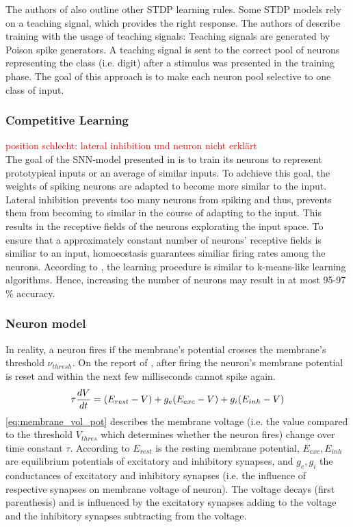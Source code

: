 The authors of \cite{SNN} also outline other \ac{STDP} learning rules.
Some \ac{STDP} models rely on a teaching signal, which provides the right response.
The authors of \cite{STDP_like} describe training with the usage of teaching signals:
Teaching signals are generated by Poison spike generators.
A teaching signal is sent to the correct pool of neurons representing the class (i.e. digit) after a stimulus was presented in the training phase.
The goal of this approach is to make each neuron pool selective to one class of input.


\subsubsection{Competitive Learning}
\textcolor{red}{position schlecht: lateral inhibition und neuron nicht erklärt\\}
The goal of the \ac{SNN}-model presented in \cite{SNN} is to train its neurons to represent prototypical inputs or an average of similar inputs.
To adchieve this goal, the weights of spiking neurons are adapted to become more similar to the input.
Lateral inhibition prevents too many neurons from spiking and thus, prevents them from becoming to similar in the course of adapting to the input.
This results in the receptive fields of the neurons explorating the input space.
To ensure that a approximately constant number of neurons' receptive fields is similiar to an input, 
homoeostasis guarantees similiar firing rates among the neurons.
According to \cite{SNN}, the learning procedure is similar to k-means-like learning algorithms.
Hence, increasing the number of neurons may result in at most 95-97 \% accuracy.


\subsubsection{Neuron model}
\label{subsubsec:neuron_model}
In reality, a neuron fires if the membrane's potential crosses the membrane's threshold $\nu_{thresh}$.
On the report of \cite{SNN}, after firing the neuron's membrane potential is reset and within the next few milliseconds cannot spike again.
%
\begin{equation}
    \centering
    \label{eq:membrane_vol_pot}
    \tau \frac{dV}{dt} = (E_{rest} - V) + g_e(E_{exc} - V) + g_i(E_{inh} - V)
\end{equation}
%
\autoref{eq:membrane_vol_pot} describes the membrane voltage (i.e. the value compared to the threshold $V_{thres}$ which determines whether the neuron fires) change over time constant $\tau$.
According to \cite{SNN} $E_{rest}$ is the resting membrane potential, $E_{exc}, E_{inh}$ are equilibrium potentials of excitatory and inhibitory synapses, and $g_e, g_i$ the conductances of excitatory and inhibitory synapses (i.e. the influence of respective synapses on membrane voltage of neuron). 
The voltage decays (first parenthesis) and is influenced by the excitatory synapses adding to the voltage and the inhibitory synapses subtracting from the voltage.


